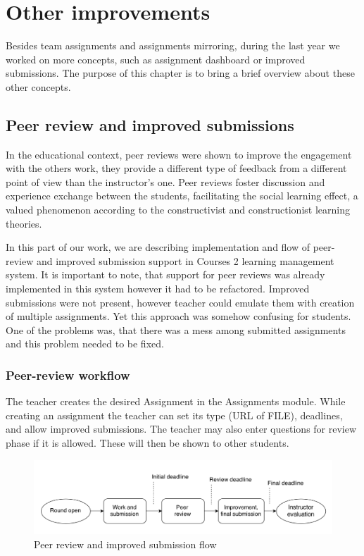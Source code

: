 \chapter{Other improvements}
\label{sec:other}
Besides team assignments and assignments mirroring, during the last year we worked on more concepts, such as assignment dashboard or improved submissions. The purpose of this chapter is to bring a brief overview about these other concepts.

\section{Peer review and improved submissions}

In the educational context, peer reviews were shown to improve the engagement with the others work, they provide a different type of feedback from a different point of view than the instructor’s one. Peer reviews foster discussion and experience exchange between the students, facilitating the social learning effect, a valued phenomenon according to the constructivist and constructionist learning theories. \cite{peerreview}


In this part of our work, we are describing implementation and flow of peer-review and improved submission support in Courses 2 learning management system. It is important to note, that support for peer reviews was already implemented in this system however it had to be refactored. Improved submissions were not present, however teacher could emulate them with creation of multiple assignments. Yet this approach was somehow confusing for students. One of the problems was, that there was a mess among submitted assignments and this problem needed to be fixed.


\subsection{Peer-review workflow}

The teacher creates the desired Assignment in the Assignments module. While creating an assignment the teacher can set its type (URL of FILE), deadlines, and allow improved submissions. The teacher may also enter questions for review phase if it is allowed. These will then be shown to other students.

\begin{figure}[h]
    \centering
    \includegraphics[width=\textwidth]{images/peerreview.png}
    \caption{Peer review and improved submission flow}
    \label{fig:improved_submissions}
\end{figure}


